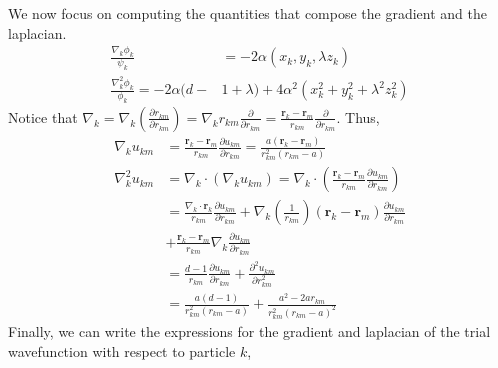 \documentclass[aps,reprint,superscriptaddress,nofootinbib]{revtex4-2}
\begin{document}
    We now focus on computing the quantities that compose the gradient and the laplacian. 
    \begin{align*}
        \frac{\nabla_k \phi_k}{\psi_k} &= -2 \alpha (x_k, y_k, \lambda z_k) \\
        \frac{\nabla_k^2 \phi_k}{\phi_k} = -2 \alpha (d -& 1 + \lambda) + 4 \alpha^2 (x_k^2 + y_k^2 + \lambda^2 z_k^2)
    \end{align*}
    Notice that \(\nabla_k = \nabla_k \left( \frac{\partial r_{km}}{\partial r_{km}} \right) = \nabla_k r_{km} \frac{\partial}{\partial r_{km}} = \frac{\bm r_k - \bm r_m}{r_{km}} \frac{\partial}{\partial r_{km}}\). Thus,
        \begin{align*}
            \nabla_k u_{km} &= \frac{\bm r_k - \bm r_m}{r_{km}} \frac{\partial u_{km}}{\partial r_{km}} = \frac{a(\bm r_k - \bm r_m)}{r_{km}^2 (r_{km} - a)} \\
            \nabla_k^2 u_{km} &= \nabla_k \cdot (\nabla_k u_{km}) = \nabla_k \cdot \left( \frac{\bm r_k - \bm r_m}{r_{km}} \frac{\partial u_{km}}{\partial r_{km}} \right) \\
            &= \frac{\nabla_k \cdot \bm r_k}{r_{km}} \frac{\partial u_{km}}{\partial r_{km}} + \nabla_k \left( \frac{1}{r_{km}} \right) (\bm r_k - \bm r_m) \frac{\partial u_{km}}{\partial r_{km}} \\
            &+ \frac{\bm r_k - \bm r_m}{r_{km}} \nabla_k \frac{\partial u_{km}}{\partial r_{km}} \\
            &= \frac{d-1}{r_{km}} \frac{\partial u_{km}}{\partial r_{km}} + \frac{\partial^2 u_{km}}{\partial r_{km}^2} \\
            &= \frac{a(d - 1)}{r_{km}^2 (r_{km} - a)} + \frac{a^2 - 2 a r_{km}}{r_{km}^2 (r_{km} - a)^2}
        \end{align*}
    Finally, we can write the expressions for the gradient and laplacian of the trial wavefunction with respect to particle \(k\), 
\end{document}
